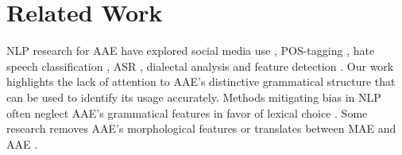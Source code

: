 \section{Related Work}
NLP research for AAE have explored social media use \citep{blodgett-etal-2018-twitter}, POS-tagging \citep{dacon2022deep,JorgensenHS16}, hate speech classification \citep{Harrisetalhatespeechgrammar2022,SapCGCS19}, ASR \citep{koenecke2020racial,Martin_Tang_RacialBias_HabBe_Interspeech2020_2020}, dialectal analysis
\citep{BlodgettGO16,dacon2022deep,Stewart14} and feature detection \citep{masis-etal-2022-corpus,santiago_disambiguation_2022,previlon-etal-2024-leveraging}. Our work highlights the lack of attention to AAE's distinctive grammatical structure that can be used to identify its usage accurately. Methods mitigating bias in NLP often neglect AAE's grammatical features in favor of lexical choice 
\citep{BarikeriLVG20,ChengK022,GarimellaMA22,hwang-etal-2020-towards, KiritchenkoM18,maronikolakis-etal-2022-analyzing,silva-etal-2021-towards}. Some research removes AAE's morphological features \citep{tan-etal-2020-mind} or translates between MAE and AAE \citep{ziems-etal-2023-multi}.